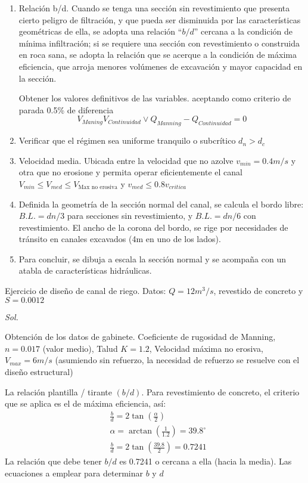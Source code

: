 \begin{enumerate}
    \item Relación b/d. Cuando se tenga una sección sin revestimiento que presenta cierto peligro de filtración, y que pueda ser disminuida por las características geométricas de ella, se adopta una relación ``$b/d$'' cercana a la condición de mínima infiltración; si se requiere una sección con revestimiento o construida en roca sana, se adopta la relación que se acerque a la condición de máxima eficiencia, que arroja menores volúmenes de excavación y mayor capacidad en la sección. 

    Obtener los valores definitivos de las variables. aceptando como criterio de parada 0.5\% de diferencia
    \begin{equation}
        V_{Maning} V_{Continuidad}\lor Q_{Manning} - Q_{Continuidad} = 0
    \end{equation}
    \item Verificar que el régimen sea uniforme tranquilo o subcrítico $d_n>d_c$
    \item Velocidad media. Ubicada entre la velocidad que no azolve $v_{min}=0.4m/s$ y otra que no erosione y permita operar eficientemente el canal $V_{min}\leq V_{med}\leq V_{\text{Max no erosiva}}$ y $v_{med}\leq 0.8v_{critica}$
    \item Definida la geometría de la sección normal del canal, se calcula el bordo libre: $B.L.=dn/3$ para secciones sin revestimiento, y $B.L.=dn/6$ con revestimiento. El ancho de la corona del bordo, se rige por necesidades de tránsito en canales excavados (4m en uno de los lados).
    \item Para concluir, se dibuja a escala la sección normal y se acompaña con un atabla de características hidráulicas.
\end{enumerate}
\begin{example}
    Ejercicio de diseño de canal de riego. Datos: $Q=12m^3/s$, revestido de concreto y $S=0.0012$
\end{example}
\textit{ Sol. }

Obtención de los datos de gabinete. Coeficiente de rugosidad de Manning, $n=0.017$ (valor medio), Talud $K=1.2$, Velocidad máxima no erosiva, $V_{max}=6m/s$ (asumiendo sin refuerzo, la necesidad de refuerzo se resuelve con el diseño estructural)

La relación plantilla / tirante $(b/d)$. Para revestimiento de concreto, el criterio que se aplica es el de máxima eficiencia, así:
\begin{align*}
    &\frac{b}{d} = 2\tan{\left(\frac{\alpha}{2}\right)}\\
    &\alpha = \arctan{\left(\frac{1}{1.2}\right)} = 39.8^{\circ}\\
    &\frac{b}{d} = 2 \tan{\left(\frac{39.8}{2}\right)} = 0.7241
\end{align*}
La relación que debe tener $b/d$ es 0.7241 o cercana a ella (hacia la media). Las ecuaciones a emplear para determinar $b$ y $d$

